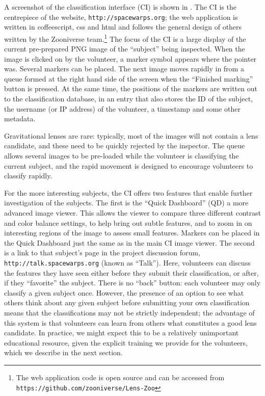 \documentclass[useAMS,usenatbib,a4paper]{mn2e}
\begin{document}
A screenshot of the \sw classification interface (CI) is shown in
. The CI is the centrepiece of the \sw website,
\texttt{http://spacewarps.org}; the web application is written in
coffeescript, css and html and follows the general design of others written by
the Zooniverse team.\footnote{The \sw web application code is open source and
can be accessed from \texttt{https://github.com/zooniverse/Lens-Zoo}}  The
focus of the CI is a large display of the current pre-prepared PNG image of
the ``subject'' being inspected.   When the image is clicked on by the
volunteer, a marker symbol appears where the pointer was. Several markers can
be placed.  The next image moves rapidly in from a queue formed at the right
hand side of the screen when the ``Finished marking'' button is pressed. At
the same time, the positions of the markers are written out to the
classification database, in an entry that also stores the ID of the subject,
the username (or IP address) of the volunteer, a timestamp and some other
metadata. 

Gravitational lenses are rare: typically, most of the images will not contain
a lens candidate, and these need to be quickly rejected by the inspector. The
queue allows several images to be pre-loaded while the volunteer is
classifying the current subject, and the rapid movement is designed to
encourage volunteers to classify rapidly.


For the more interesting subjects, the CI offers two features that  enable
further investigation of the subjects. The first is the ``Quick Dashboard'' (QD) a
more advanced image viewer. This allows the viewer to compare three different
contrast and color balance settings, to help bring out subtle features, and to
zoom in on interesting regions of the image to assess small features. Markers
can be placed in the Quick Dashboard just the same as in the main CI image
viewer. The second is a link to that subject's page in the project discussion
forum, \texttt{http://talk.spacewarps.org} (known as ``Talk''). Here,
volunteers can discuss the features they have seen either before they submit
their classification, or after, if they ``favorite'' the subject. There is no
``back'' button: each volunteer may only classify a given subject once.
However, the presence of an option to see what others think about any given
subject before submitting your own classification means that the
classifications may not be  strictly independent; the advantage of this system
is that volunteers can learn from others what constitutes a good lens
candidate. In practice, we might expect this to be a relatively unimportant
educational resource, given the explicit training we provide for the
volunteers, which we describe in the next section.
\end{document}

